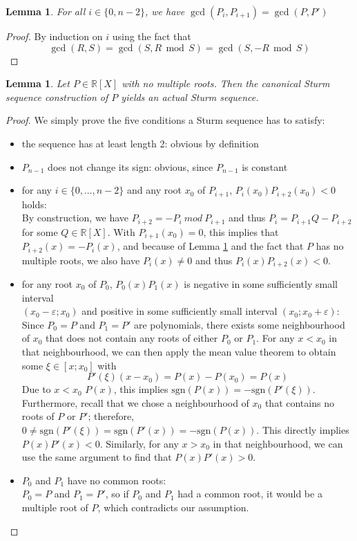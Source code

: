 \documentclass[11pt,a4paper,oneside]{article}
\newtheorem{lemma}[definition]{Lemma}
\newcommand{\RR}{\mathbb{R}}
\renewcommand{\epsilon}{\varepsilon}
\newcommand{\sgn}{\mathrm{sgn}}
\renewcommand{\mod}{\ \ \textrm{mod}\ \ }
\begin{document}
\begin{lemma}\label{thm:sturm_gcd}
For all $i\in\{0,n-2\}$, we have $\gcd(P_i, P_{i+1}) = \gcd(P,P')$
\end{lemma}
\begin{proof}
By induction on $i$ using the fact that $$\gcd(R,S)=\gcd(S,R\mod S)=\gcd(S,-R\mod S)$$\vskip-3mm
\end{proof}\vskip3mm

\begin{lemma}\label{thm:sturm_seq_canonical}
Let $P\in\RR[X]$ with no multiple roots. Then the canonical Sturm sequence construction of $P$ yields an actual Sturm sequence.
\end{lemma}
\begin{proof}
We simply prove the five conditions a Sturm sequence has to satisfy:
\begin{itemize}
\item the sequence has at least length 2: obvious by definition
\item $P_{n-1}$ does not change its sign: obvious, since $P_{n-1}$ is constant
\item for any $i\in\{0,\ldots,n-2\}$ and any root $x_0$ of $P_{i+1}$, $P_{i}(x_0)P_{i+2}(x_0) < 0$ holds:\\
By construction, we have $P_{i+2} = -P_{i}\ \textit{mod}\ P_{i+1}$ and thus $P_i = P_{i+1}Q - P_{i+2}$ for some $Q\in\RR[X]$. With $P_{i+1}(x_0)=0$, this implies that $P_{i+2}(x) = -P_i(x)$, and because of Lemma \ref{thm:sturm_gcd} and the fact that $P$ has no multiple roots, we also have $P_i(x)\neq 0$ and thus $P_i(x)P_{i+2}(x)<0$.
\item for any root $x_0$ of $P_0$, $P_0(x)P_1(x)$ is negative in some sufficiently small interval\\ \mbox{$(x_0-\epsilon;x_0)$} and positive in some sufficiently small interval $(x_0;x_0+\epsilon)$:\\
Since $P_0=P$ and $P_1=P'$ are polynomials, there exists some neighbourhood of $x_0$ that does not contain any roots of either $P_0$ or $P_1$.
For any $x<x_0$ in that neighbourhood, we can then apply the mean value theorem to obtain some $\xi\in[x;x_0]$ with 
$$P'(\xi)(x-x_0) = P(x)-P(x_0) = P(x)$$
Due to $x < x_0$ $P(x)$, this implies $\sgn(P(x))=-\sgn(P'(\xi))$. Furthermore, recall that we chose a neighbourhood of $x_0$ that contains no roots of $P$ or $P'$; therefore, $0\neq \sgn(P'(\xi))=\sgn(P'(x))=-\sgn(P(x))$. This directly implies $P(x)P'(x)<0$. Similarly, for any $x>x_0$ in that neighbourhood, we can use the same argument to find that $P(x)P'(x)>0$.
\item $P_0$ and $P_1$ have no common roots:\\
$P_0=P$ and $P_1=P'$, so if $P_0$ and $P_1$ had a common root, it would be a multiple root of $P$, which contradicts our assumption.
\end{itemize}
\end{proof}
\end{document}
